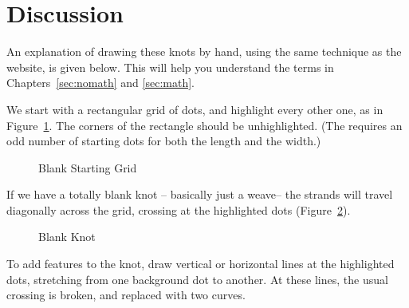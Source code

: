 \documentclass[openany]{book}
\begin{document}
\section*{Discussion}
An explanation of drawing these knots by hand, using the same technique as the website, is given below. This will help you understand the terms in Chapters~\ref{sec:nomath} and \ref{sec:math}.

We start with a rectangular grid of dots, and highlight every other one, as in Figure~\ref{fig:start}.  The corners of the rectangle should be unhighlighted. (The requires an odd number of starting dots for both the length and the width.)

\begin{figure}[H]
\centering
{}
\caption{Blank Starting Grid}\label{fig:start}
\end{figure}

If we have a totally blank knot -- basically just a weave-- the strands will travel diagonally across the grid, crossing at the highlighted dots (Figure~\ref{fig:blank}).

\begin{figure}[H]
\centering
{}
\caption{Blank Knot}\label{fig:blank}
\end{figure}

To add features to the knot, draw vertical or horizontal lines at the highlighted dots, stretching from one background dot to another. At these lines, the usual crossing is broken, and replaced with two curves.
\end{document}
